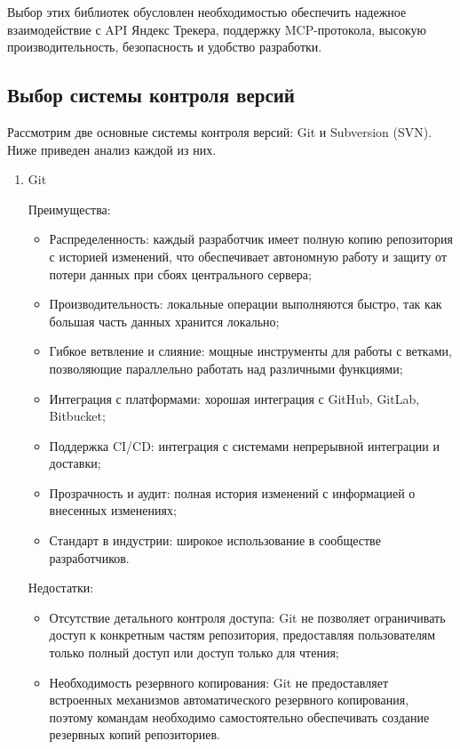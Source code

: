 \documentclass[utf8, russian]{eskdtext}
\begin{document}
    Выбор этих библиотек обусловлен необходимостью обеспечить надежное взаимодействие с API Яндекс Трекера, поддержку MCP-протокола, высокую производительность, безопасность и удобство разработки.

\subsection{Выбор системы контроля версий}

Рассмотрим две основные системы контроля версий: Git и Subversion (SVN). Ниже приведен анализ каждой из них.

\begin{enumerate}
\item Git

    Преимущества:
    \begin{itemize}
        \item Распределенность: каждый разработчик имеет полную копию репозитория с историей изменений, что обеспечивает автономную работу и защиту от потери данных при сбоях центрального сервера;
        \item Производительность: локальные операции выполняются быстро, так как большая часть данных хранится локально;
        \item Гибкое ветвление и слияние: мощные инструменты для работы с ветками, позволяющие параллельно работать над различными функциями;
        \item Интеграция с платформами: хорошая интеграция с GitHub, GitLab, Bitbucket;
        \item Поддержка CI/CD: интеграция с системами непрерывной интеграции и доставки;
        \item Прозрачность и аудит: полная история изменений с информацией о внесенных изменениях;
        \item Стандарт в индустрии: широкое использование в сообществе разработчиков.
    \end{itemize}

     Недостатки:
    \begin{itemize}
        \item Отсутствие детального контроля доступа: Git не позволяет ограничивать доступ к конкретным частям репозитория, предоставляя пользователям только полный доступ или доступ только для чтения;
        \item Необходимость резервного копирования: Git не предоставляет встроенных механизмов автоматического резервного копирования, поэтому командам необходимо самостоятельно обеспечивать создание резервных копий репозиториев.
    \end{itemize}



\end{enumerate}
\end{document}
